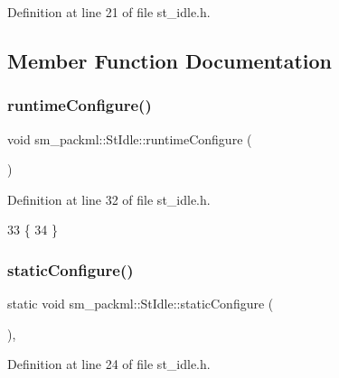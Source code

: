 Definition at line 21 of file st\+\_\+idle.\+h.



\subsection{Member Function Documentation}
\mbox{\label{structsm__packml_1_1StIdle_ae4ae54c43e2ee7372a753eda8cd9abac}} 
\subsubsection{\texorpdfstring{runtime\+Configure()}{runtimeConfigure()}}
{\footnotesize\ttfamily void sm\+\_\+packml\+::\+St\+Idle\+::runtime\+Configure (\begin{DoxyParamCaption}{ }\end{DoxyParamCaption})\hspace{0.3cm}{\ttfamily [inline]}}



Definition at line 32 of file st\+\_\+idle.\+h.


\begin{DoxyCode}
33     \{
34     \}
\end{DoxyCode}
\mbox{\label{structsm__packml_1_1StIdle_a4fe82f96b9329edc9a5a450e1590c11e}} 
\subsubsection{\texorpdfstring{static\+Configure()}{staticConfigure()}}
{\footnotesize\ttfamily static void sm\+\_\+packml\+::\+St\+Idle\+::static\+Configure (\begin{DoxyParamCaption}{ }\end{DoxyParamCaption})\hspace{0.3cm}{\ttfamily [inline]}, {\ttfamily [static]}}



Definition at line 24 of file st\+\_\+idle.\+h.


